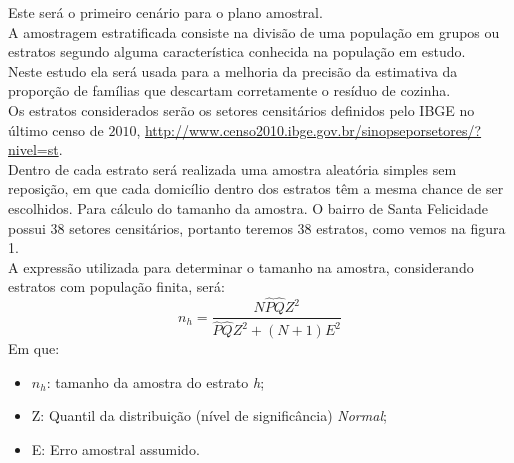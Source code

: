 \documentclass[12pt]{article}\usepackage[]{graphicx}\usepackage[]{color}
\begin{document}
Este será o primeiro cenário para o plano amostral.\\
\indent
A amostragem estratificada consiste na divisão de uma população em grupos ou
estratos segundo alguma característica conhecida na população em estudo.\\
\indent
Neste estudo ela será usada para a melhoria da precisão da estimativa da
proporção de famílias que descartam corretamente o resíduo de cozinha.\\
\indent
Os estratos considerados serão os setores censitários definidos pelo IBGE
no último censo de $2010$,
\url{http://www.censo2010.ibge.gov.br/sinopseporsetores/?nivel=st}.\\
\indent
Dentro de cada estrato será realizada uma amostra aleatória simples sem reposição, 
em que cada domicílio dentro dos estratos têm a mesma chance de ser escolhidos. 
Para cálculo do tamanho da amostra. O bairro de Santa Felicidade possui $38$
setores censitários, portanto teremos 38 estratos, como vemos na figura 1.\\
\indent
A expressão utilizada para determinar o tamanho na amostra, considerando
estratos com população finita, será:\\

\begin{equation}
  n_{h} = \frac{N\hat{P}\hat{Q}Z^{2}}{\hat{P}\hat{Q}Z^{2}+(N+1)E^{2}}
\end{equation}
Em que:\\
\indent

\begin{itemize}
\item $n_h$: tamanho da amostra do estrato \textit{h};
\item Z: Quantil da distribuição (nível de significância) \textit{Normal};
\item E: Erro amostral assumido.
\end{itemize}
\end{document}
